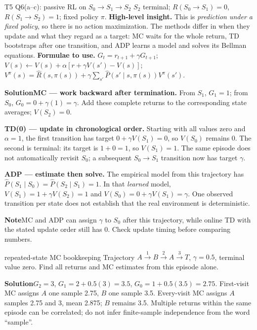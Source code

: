 \documentclass[10pt,a4paper]{article}
\newcommand{\ans}{\par\smallskip\textbf{\color{good}Solution\quad}}
\newcommand{\pit}{\par\smallskip\textbf{\color{warn}Note\quad}}
\begin{document}
\begin{question}{T5 Q6(a--c): passive RL on $S_0\to S_1\to S_2$}\label{q:t5q6}
$S_2$ terminal; $R(S_0\to S_1)=0$, $R(S_1\to S_2)=1$; fixed policy $\pi$.
\textbf{High-level insight.} This is \emph{prediction under a fixed policy}, so there is no action maximization. The methods differ in when they update and what they regard as a target: MC waits for the whole return, TD bootstraps after one transition, and ADP learns a model and solves its Bellman equations.
\textbf{Formulae to use.} $G_t=r_{t+1}+\gamma G_{t+1}$; $V(s)\leftarrow V(s)+\alpha[r+\gamma V(s')-V(s)]$; $V^\pi(s)=\hat R(s,\pi(s))+\gamma\sum_{s'}\hat P(s'\mid s,\pi(s))V^\pi(s')$.
\ans \textbf{MC --- work backward after termination.} From $S_1$, $G_1=1$; from $S_0$, $G_0=0+\gamma(1)=\gamma$. Add these complete returns to the corresponding state averages; $V(S_2)=0$.

\textbf{TD(0) --- update in chronological order.} Starting with all values zero and $\alpha=1$, the first transition has target $0+\gamma V(S_1)=0$, so $V(S_0)$ remains 0. The second is terminal: its target is $1+0=1$, so $V(S_1)=1$. The same episode does not automatically revisit $S_0$; a subsequent $S_0\to S_1$ transition now has target $\gamma$.

\textbf{ADP --- estimate then solve.} The empirical model from this trajectory has $\hat P(S_1\mid S_0)=\hat P(S_2\mid S_1)=1$. In that \emph{learned} model, $V(S_1)=1+\gamma V(S_2)=1$ and $V(S_0)=0+\gamma V(S_1)=\gamma$. One observed transition per state does not establish that the real environment is deterministic.
\pit MC and ADP can assign $\gamma$ to $S_0$ after this trajectory, while online TD with the stated update order still has 0. Check update timing before comparing numbers.
\end{question}

\begin{question}{repeated-state MC bookkeeping}
Trajectory $A\xrightarrow{1}B\xrightarrow{2}A\xrightarrow{3}T$, $\gamma=0.5$, terminal value zero. Find all returns and MC estimates from this episode alone.
\ans $G_2=3$, $G_1=2+0.5(3)=3.5$, $G_0=1+0.5(3.5)=2.75$. First-visit MC assigns $A$ one sample 2.75, $B$ one sample 3.5. Every-visit MC assigns $A$ samples 2.75 and 3, mean 2.875; $B$ remains 3.5. Multiple returns within the same episode can be correlated; do not infer finite-sample independence from the word ``sample''.
\end{question}
\end{document}

